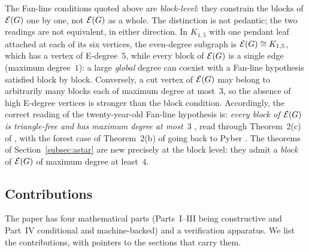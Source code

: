 The Fan-line conditions quoted above are \emph{block-level}: they constrain the blocks of
$\mathcal{E}(G)$ one by one, not $\mathcal{E}(G)$ as a whole. The distinction is not pedantic; the two
readings are not equivalent, in either direction. In $K_{1,5}$ with one pendant leaf attached
at each of its six vertices, the even-degree subgraph is $\mathcal{E}(G)\cong K_{1,5}$, which has a
vertex of E-degree~$5$, while every block of $\mathcal{E}(G)$ is a single edge (maximum degree~$1$):
a large \emph{global} degree can coexist with a Fan-line hypothesis satisfied block by block.
Conversely, a cut vertex of $\mathcal{E}(G)$ may belong to arbitrarily many blocks each of maximum
degree at most~$3$, so the absence of high E-degree vertices is stronger than the block
condition. Accordingly, the correct reading of the twenty-year-old Fan-line hypothesis is:
\emph{every block of $\mathcal{E}(G)$ is triangle-free and has maximum degree at most~$3$}
\cite{Fan05}, read through Theorem~2(c) of \cite{BS21}, with the forest case of
Theorem~2(b) of \cite{BS21} going back to Pyber \cite{Pyb96}. The theorems of
Section~\ref{subsec:astar} are new precisely at the block level: they admit a \emph{block} of
$\mathcal{E}(G)$ of maximum degree at least~$4$.

\subsection{Contributions}\label{int:subsec-contrib}

The paper has four mathematical parts (Parts~I--III being constructive and Part~IV
conditional and machine-backed) and a verification apparatus. We list the contributions,
with pointers to the sections that carry them.

